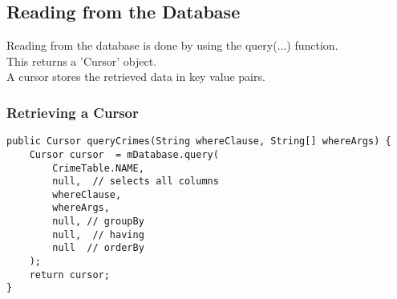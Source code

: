 \documentclass[]{article}
\begin{document}
\subsection{Reading from the Database}
 Reading from the database is done by using the query(...) function. 
 \\
 This returns a 'Cursor' object.
 \\
 A cursor stores the retrieved data in key value pairs.
 \subsubsection{Retrieving a Cursor }
 \begin{lstlisting}
public Cursor queryCrimes(String whereClause, String[] whereArgs) {
	Cursor cursor  = mDatabase.query(
		CrimeTable.NAME,
		null,  // selects all columns
		whereClause,
		whereArgs,
		null, // groupBy
		null,  // having
		null  // orderBy
	);
	return cursor;
}
 \end{lstlisting}
\end{document}
